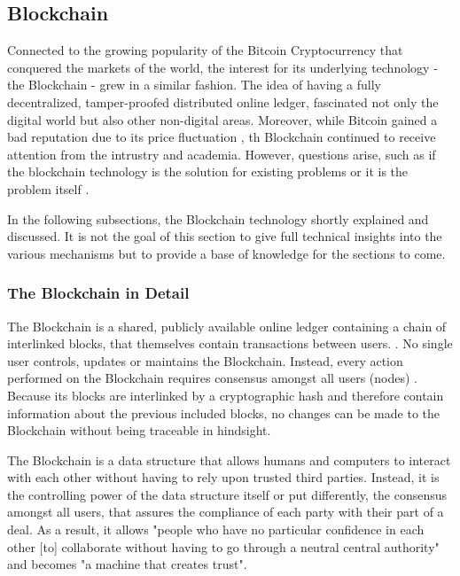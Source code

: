 \subsection{Blockchain}
\label{subsec:02_Blockchain}

Connected to the growing popularity of the Bitcoin Cryptocurrency that conquered the markets of the world, the interest for its underlying technology - the Blockchain - grew in a similar fashion. The idea of having a fully decentralized, tamper-proofed distributed online ledger, fascinated not only the digital world but also other non-digital areas. Moreover, while Bitcoin gained a bad reputation due to its price fluctuation \cite{Shackelford2016}, th Blockchain continued to receive attention from the intrustry and academia. However, questions arise, such as  if the blockchain technology is the solution for existing problems or it is the problem itself \cite{Stinchcombe2017, Nielsen2018, Lunn2015}.

In the following subsections, the Blockchain technology shortly explained and discussed. It is not the goal of this section to give full technical insights into the various mechanisms but to provide a base of knowledge for the sections to come.

\subsubsection{The Blockchain in Detail}
The Blockchain is a shared, publicly available online ledger containing a chain of interlinked blocks, that themselves contain transactions between users. \cite{Wust2017}. No single user controls, updates or maintains the Blockchain. Instead, every action performed on the Blockchain requires consensus amongst all users (nodes) \cite{Shackelford2016}. Because its blocks are interlinked by a cryptographic hash and therefore contain information about the previous included blocks, no changes can be made to the Blockchain without being traceable in hindsight.

The Blockchain is a data structure that allows humans and computers to interact with each other without having to rely upon trusted third parties. Instead, it is the controlling power of the data structure itself or put differently, the consensus amongst all users, that assures the compliance of each party with their part of a deal. As a result, it allows "people who have no particular confidence in each other [to] collaborate without having to go through a neutral central authority" and becomes "a machine that creates trust". \cite{Economist2015} \cite{Shackelford2016}

